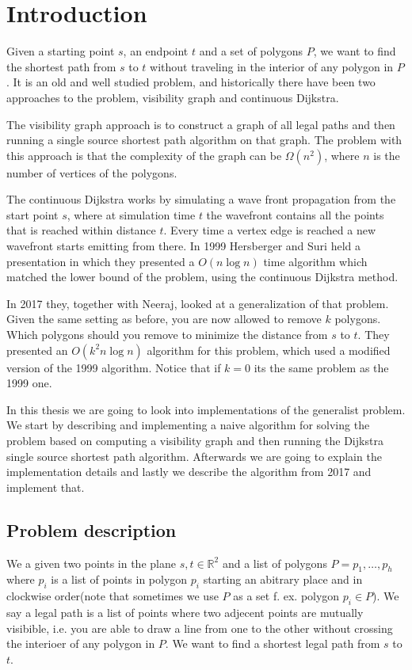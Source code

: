 \chapter{Introduction} Given a starting point $s$, an endpoint $t$ and a set of
polygons $P$, we want to find the shortest path from $s$ to $t$ without
traveling in the interior of any polygon in $P$. It is an old and well studied
problem, and historically there have been two approaches to the problem,
visibility graph and continuous Dijkstra. 

The visibility graph approach is to construct a graph of all legal paths
 and
then running a single source shortest path algorithm on that graph. The problem
with this approach is that the complexity of the graph can be $\Omega(n^2)$,
where $n$ is the number of vertices of the polygons. 

The continuous Dijkstra works by simulating a wave front
propagation from the
start point $s$, where at simulation time $t$ the wavefront contains all the
points that is reached within distance $t$.  Every time a vertex edge is
reached a new wavefront starts emitting from there. In 1999 Hersberger and Suri
held a presentation in which they presented a $O(n\log n)$ time algorithm which
matched the lower bound of the problem, using the continuous Dijkstra method.

In 2017 they, together with Neeraj, looked at a generalization of that problem.
Given the same setting as before, you are now allowed to remove $k$ polygons.
Which polygons should you remove to minimize the distance from $s$ to $t$. They
presented an $O(k^2 n\log n)$ algorithm for this problem, which used a modified
version of the 1999 algorithm. Notice that if $k=0$ its the same problem as the
1999 one.

In this thesis we are going to look into implementations of the generalist
problem. We start by describing and implementing a naive algorithm for solving
the problem based on computing a visibility graph and then running the Dijkstra
single source shortest path algorithm. Afterwards we are going to explain the
implementation details and lastly we describe the algorithm from 2017 and
implement that.

\section{Problem description} 
We a given two points in the plane $s,t\in\mathbb{R}^2$ and a list of polygons
$P=p_1,\dots,p_h$ where $p_i$ is a list of points in polygon $p_i$ starting an
abitrary place and in clockwise order(note that sometimes we use $P$ as a set
f. ex. polygon $p_i\in P$). We say a legal path is a list of points where two
adjecent points are mutually visibible, i.e. you are able to draw a line from
one to the other without crossing the interioer of any polygon in $P$. 
We want to find a shortest legal path from $s$ to $t$.

